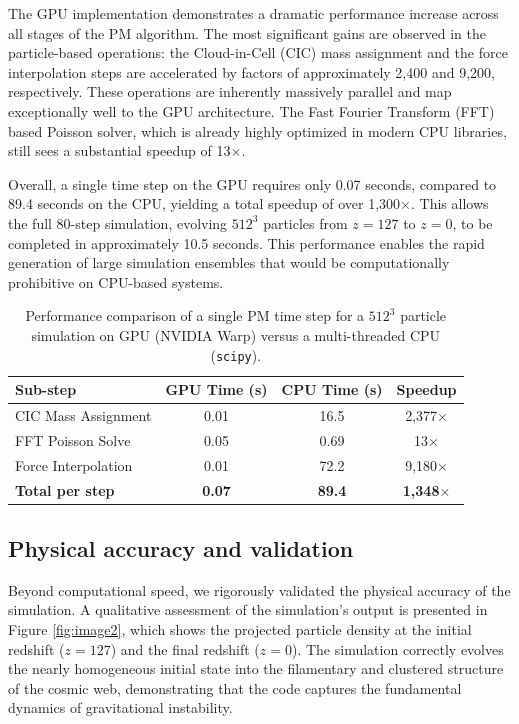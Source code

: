 \documentclass[]{article}
\begin{document}
The GPU implementation demonstrates a dramatic performance increase across all stages of the PM algorithm. The most significant gains are observed in the particle-based operations: the Cloud-in-Cell (CIC) mass assignment and the force interpolation steps are accelerated by factors of approximately 2,400 and 9,200, respectively. These operations are inherently massively parallel and map exceptionally well to the GPU architecture. The Fast Fourier Transform (FFT) based Poisson solver, which is already highly optimized in modern CPU libraries, still sees a substantial speedup of 13$\times$.

Overall, a single time step on the GPU requires only 0.07 seconds, compared to 89.4 seconds on the CPU, yielding a total speedup of over 1,300$\times$. This allows the full 80-step simulation, evolving $512^3$ particles from $z=127$ to $z=0$, to be completed in approximately 10.5 seconds. This performance enables the rapid generation of large simulation ensembles that would be computationally prohibitive on CPU-based systems.

\begin{table}[h!]
\centering
\caption{Performance comparison of a single PM time step for a $512^3$ particle simulation on GPU (NVIDIA Warp) versus a multi-threaded CPU (\texttt{scipy}).}
\label{tab:performance}
\begin{tabular}{lccc}
\hline
\hline
Sub-step & GPU Time (s) & CPU Time (s) & Speedup \\
\hline
CIC Mass Assignment & 0.01 & 16.5 & 2,377$\times$ \\
FFT Poisson Solve & 0.05 & 0.69 & 13$\times$ \\
Force Interpolation & 0.01 & 72.2 & 9,180$\times$ \\
\hline
\textbf{Total per step} & \textbf{0.07} & \textbf{89.4} & \textbf{1,348$\times$} \\
\hline
\end{tabular}
\end{table}

\subsection{Physical accuracy and validation}

Beyond computational speed, we rigorously validated the physical accuracy of the simulation. A qualitative assessment of the simulation's output is presented in Figure \ref{fig:image2}, which shows the projected particle density at the initial redshift ($z=127$) and the final redshift ($z=0$). The simulation correctly evolves the nearly homogeneous initial state into the filamentary and clustered structure of the cosmic web, demonstrating that the code captures the fundamental dynamics of gravitational instability.
\end{document}
